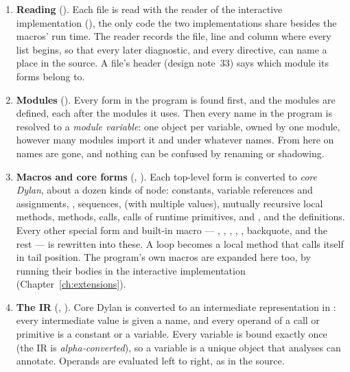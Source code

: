 \begin{enumerate}
\item \textbf{Reading} (). Each file is read
  with the reader of the interactive implementation
  (), the only code the two implementations share
  besides the macros' run time. The reader records the file, line and
  column where every list begins, so that every later diagnostic, and
  every  directive, can name a place in the source. A file's
   header (design note~33) says which module its forms
  belong to.

\item \textbf{Modules} (). Every
   form in the program is found first, and the
  modules are defined, each after the modules it uses. Then every name
  in the program is resolved to a \emph{module variable}: one object per
  variable, owned by one module, however many modules import it and under
  whatever names. From here on names are gone, and nothing can be
  confused by renaming or shadowing.

\item \textbf{Macros and core forms} (,
  ). Each top-level form is converted to
  \emph{core Dylan}, about a dozen kinds of node: constants, variable
  references and assignments, , sequences,  (with
  multiple values), mutually recursive local methods, methods, calls,
  calls of runtime primitives,  and
  , and the definitions. Every other special form
  and built-in macro --- , , ,
  , , backquote,  and
  the rest --- is rewritten into these. A loop becomes a local method
  that calls itself in tail position. The program's own macros are
  expanded here too, by running their bodies in the interactive
  implementation (Chapter~\ref{ch:extensions}).

\item \textbf{The IR} (, ). Core
  Dylan is converted to an intermediate representation in
  : every intermediate value is given a name, and
  every operand of a call or primitive is a constant or a variable.
  Every variable is bound exactly once (the IR is \emph{alpha-converted}),
  so a variable is a unique object that analyses can annotate. Operands
  are evaluated left to right, as in the source.


\end{enumerate}

